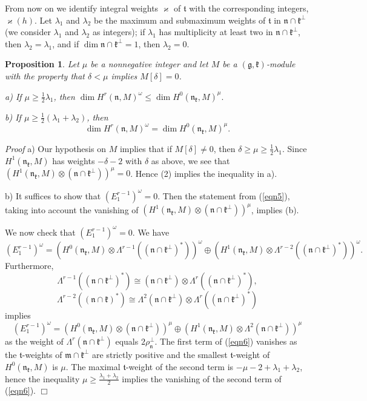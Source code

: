 \documentclass[11pt]{amsart}
\newcounter{theorem}
\newtheorem{prop}[theo]{Proposition}
\renewenvironment{proof}{ \emph{Proof}}{$\Box$}
\renewcommand{\tt}{\mathfrak{t}}
\newcommand{\kk}{\mathfrak{k}}
\newcommand{\nn}{\mathfrak{n}}
\newcommand{\mm}{\mathfrak{m}}
\renewcommand{\gg}{\mathfrak{g}}
\newcommand{\half}{\frac{1}{2}}
\newcommand{\refeq}[1]{(\ref{#1})}
\begin{document}
From now on we identify integral weights $\varkappa$ of $\tt$ with the corresponding integers, $\varkappa(h)$. Let $\lambda_1$ and $\lambda_2$ be the maximum and submaximum weights of $\tt$ in $\nn\cap\kk^\perp$ (we consider $\lambda_1$ and $\lambda_2$ as integers); if $\lambda_1$ has multiplicity at least two in $\nn\cap\kk^\perp$, then $\lambda_2=\lambda_1$,
and if $\dim \nn\cap\kk^\perp=1$, then $\lambda_2=0$.
\begin{prop}\label{pr5.2}
Let $\mu$ be a nonnegative integer and let $M$ be a $(\gg,\kk)$-module with the property that $\delta<\mu$ implies $M[\delta]=0$.

\noindent a) If $\mu\geq \half \lambda_1$, then $\dim H^r(\nn,M)^\omega\leq \dim H^0(\nn_\kk, M)^\mu.$

\noindent b) If $\mu\geq \half(\lambda_1+\lambda_2)$, then 
\[
\dim H^r(\nn,M)^\omega = \dim H^0(\nn_\kk,M)^\mu.
\]
\end{prop}
\begin{proof}
\noindent a)
Our hypothesis on $M$ implies that if $M[\delta]\neq 0$, then $\delta\geq\mu\geq\half\lambda_1$. Since $H^1(\nn_\kk,M)$ has weights $-\delta-2$ with $\delta$ as above, we see that \newline $\left( H^1(\nn_\kk,M)\otimes(\nn\cap\kk^\perp)\right)^\mu=0$. Hence (2) implies the inequality in a).

\noindent b) It suffices to show that $(E_1^{r-1})^\omega=0$. Then the statement from \refeq{eqn5}, taking into account the vanishing of $(H^1(\nn_\kk,M)\otimes(\nn\cap\kk^{\perp}))^\mu$, implies (b).

We now check that $(E_1^{r-1})^\omega=0$. We have $$(E_1^{r-1})^\omega = (H^0(\nn_\kk,M)\otimes\Lambda^{r-1}((\nn\cap\kk^{\perp})^*))^\omega\oplus(H^1(\nn_\kk,M)\otimes\Lambda^{r-2}((\nn\cap\kk^\perp)^*))^\omega.$$
Furthermore,
$$\Lambda^{r-1}((\nn\cap\kk^\perp)^*)\cong(\nn\cap\kk^\perp)\otimes\Lambda^r((\nn\cap\kk^\perp)^*),$$
$$\Lambda^{r-2}((\nn\cap\kk)^*)\cong\Lambda^2(\nn\cap\kk^\perp)\otimes\Lambda^r((\nn\cap\kk^\perp)^*)$$
implies
\begin{equation}\label{eqn6}
(E_1^{r-1})^\omega = (H^0(\nn_\kk,M)\otimes(\nn\cap\kk^\perp))^\mu\oplus(H^1(\nn_\kk,M)\otimes\Lambda^2(\nn\cap\kk^\perp))^\mu
\end{equation}
as the weight of $\Lambda^r(\nn\cap\kk^\perp)$ equals $2\rho_\nn^\perp$. The first term of \refeq{eqn6} vanishes as the $\tt$-weights of $\mm\cap\kk^\perp$ are strictly positive and the smallest $\tt$-weight of $H^0(\nn_\kk,M)$ is $\mu$. The maximal $\tt$-weight of the second term is $-\mu -2+\lambda_1+\lambda_2$, hence the inequality $\mu\geq\frac{\lambda_1+\lambda_2}{2}$ implies the vanishing of the second term of \refeq{eqn6}.
\end{proof}
\end{document}
